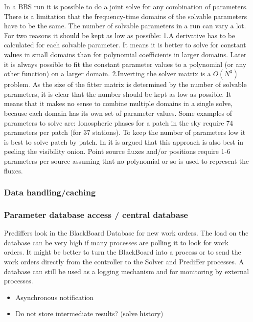 \documentclass[10pt]{lofar}
\begin{document}
In a BBS run it is possible to do a joint solve for any combination of parameters. There is a limitation that the frequency-time domains of the solvable parameters have to be the same.
The number of solvable parameters in a run can vary a lot. For two reasons it should be kept as low as possible:
1.A derivative has to be calculated for each solvable parameter. It means it is better to solve for constant values in small domains than for polynomial coefficients in larger domains. Later it is always possible to fit the constant parameter values to a polynomial (or any other function) on a larger domain.
2.Inverting the solver matrix is a $O(N^3)$ problem. As the size of the fitter matrix is determined by the number of solvable parameters, it is clear that the number should be kept as low as possible.
It means that it makes no sense to combine multiple domains in a single solve, because each domain has its own set of parameter values.
Some examples of parameters to solve are:
Ionospheric phases for a patch in the sky require 74 parameters per patch (for 37 stations).
To keep the number of parameters low it is best to solve patch by patch. In  it is argued that this approach is also best in peeling the visibility onion.
Point source fluxes and/or positions require 1-6 parameters per source assuming that no polynomial or so is used to represent the fluxes.


\subsubsection{Data handling/caching}

\subsubsection{Parameter database access / central database}
Prediffers look in the BlackBoard Database for new work orders. The load on the database can be very high if many processes are polling it to look for work orders. It might be better to turn the BlackBoard into a process or to send the work orders directly from the controller to the Solver and Prediffer processes.
A database can still be used as a logging mechanism and for monitoring by external processes.

\begin{itemize}
\item Asynchronous notification
\item Do not store intermediate results? (solve history)
\end{itemize}
\end{document}
